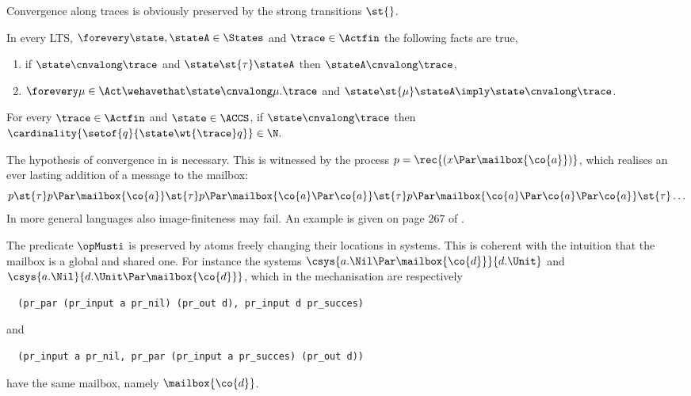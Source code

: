 Convergence along traces is obviously preserved by the strong transitions $\st{}$.

\begin{lemma}%
  \label{lem:acnv-aux}
  In every LTS,
  $\forevery \state, \stateA \in \States$ and $ \trace \in \Actfin$
  the following facts are true,
  \begin{enumerate}
    \item
       if $\state \cnvalong \trace$
      and $\state \st{\tau} \stateA$ then $\stateA \cnvalong \trace$,\label{pt:acnv-one-step-tau}
    \item
      $\forevery \mu \in \Act \wehavethat \state \cnvalong
      \mu.\trace$ and $ \state \st{\mu} \stateA \imply \state \cnvalong \trace$.\label{pt:acnv-one-step-mu}
  \end{enumerate}
\end{lemma}


\begin{lemma}%
  \label{lem:cnvalong-implies-finite-branching}
  For every $\trace \in \Actfin$ and
  $\state \in \ACCS$, if $ \state \cnvalong \trace$ then
  ${\cardinality{\setof{ \stateB }{\state \wt{ \trace} \stateB} }} \in \N.$
\end{lemma}
The hypothesis of convergence in  is necessary.
This is witnessed by the process $p =  \rec{(x \Par \mailbox{\co{a}})}$,
which realises an ever lasting addition of a message to the mailbox:
$$
p \st{\tau}
p \Par \mailbox{\co{a}} \st{\tau}  p \Par \mailbox{\co{a} \Par \co{a}}
\st{\tau}  p \Par \mailbox{\co{a} \Par \co{a} \Par \co{a}} \st{\tau}
\ldots
$$
In more general languages also image-finiteness may fail. An example
is given on page 267 of \cite{DBLP:conf/mfcs/HennessyP80}.





The predicate $\opMusti$ is preserved by atoms freely changing their locations in systems.
This is coherent with the intuition that the mailbox is a global and
shared one. For instance the systems
$ \csys{ a.\Nil \Par \mailbox{ \co{d} } }{ d.\Unit }$  and  $ \csys{  a.\Nil }{ d.\Unit
  \Par \mailbox{\co{d}} }$, which in the mechanisation are respectively
\begin{verbatim}
  (pr_par (pr_input a pr_nil) (pr_out d), pr_input d pr_succes)
\end{verbatim}
and
\begin{verbatim}
  (pr_input a pr_nil, pr_par (pr_input a pr_succes) (pr_out d))
\end{verbatim}
have the same mailbox, namely $\mailbox{ \co{d} }$.




